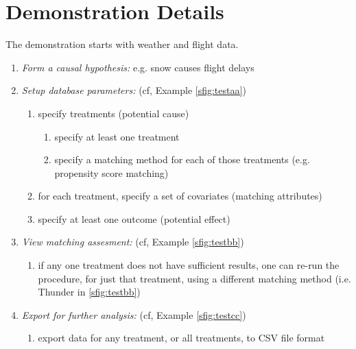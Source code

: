 \section{Demonstration Details}
\label{sec:dd}

The demonstration starts with weather and flight data.   


\begin{enumerate}
  \item {\it Form a causal hypothesis:}
    e.g. snow causes flight delays
  \item {\it Setup database parameters:} (cf, Example \ref{sfig:testaa})
    \begin{enumerate}
      \item specify treatments (potential cause)
      \begin{enumerate}
        \item specify at least one treatment
        \item specify a matching method for each of those treatments (e.g. propensity score matching)
      \end{enumerate}
      \item for each treatment, specify a set of covariates (matching attributes)
      \item specify at least one outcome (potential effect)
    \end{enumerate}
  \item {\it View matching assesment:} (cf, Example \ref{sfig:testbb})
    \begin{enumerate}
      \item if any one treatment does not have sufficient results, one can re-run the procedure, for just that treatment,
        using a different matching method (i.e. Thunder in \ref{sfig:testbb})
    \end{enumerate}
  \item {\it Export for further analysis:} (cf, Example \ref{sfig:testcc})
    \begin{enumerate}
      \item export data for any treatment, or all treatments, to CSV file format
    \end{enumerate}
\end{enumerate}


